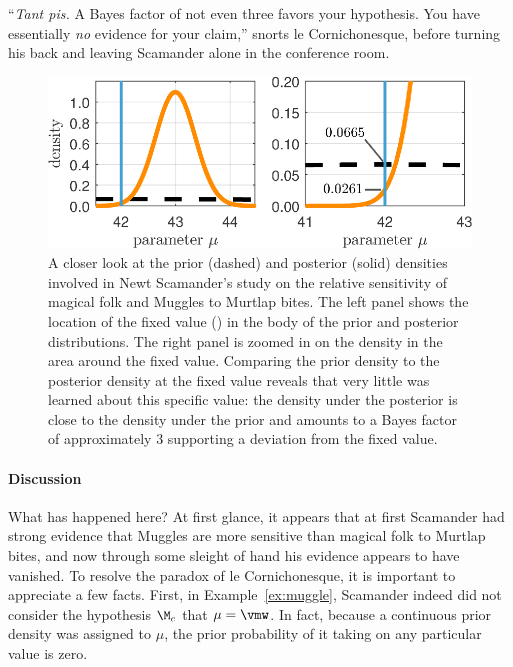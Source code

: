 ``\emph{Tant pis.} A Bayes factor of not even three favors your hypothesis. You have essentially \textit{no} evidence for your claim,'' snorts le Cornichonesque, before turning his back and leaving Scamander alone in the conference room.

\begin{figure}[bt]
\centering
\includegraphics[scale=1%
]{figs/bi0_etzvandekerckhove_fig5}\vspace{2ex}
\caption{A closer look at the prior (dashed) and posterior (solid) densities involved in Newt Scamander's study on the relative sensitivity of magical folk and Muggles to Murtlap bites. The left panel shows the location of the fixed value (\vmw) in the body of the prior and posterior distributions. The right panel is zoomed in on the density in the area around the fixed value. Comparing the prior density to the posterior density at the fixed value reveals that very little was learned about this specific value: the density under the posterior is close to the density under the prior and amounts to a Bayes factor of approximately 3 supporting a deviation from the fixed value.}\label{fig:bi0:muggle}
\end{figure}

\paragraph{Discussion} What has happened here? At first glance, it appears that at first Scamander had strong evidence that Muggles are more sensitive than magical folk to Murtlap bites, and now through some sleight of hand his evidence appears to have vanished. To resolve the paradox of le Cornichonesque, it is important to appreciate a few facts. First, in Example~\ref{ex:muggle}, Scamander indeed did not consider the hypothesis $\M_c$ that $\mu = \vmw$. In fact, because a continuous prior density was assigned to $\mu$, the prior probability of it taking on any particular value is zero.

